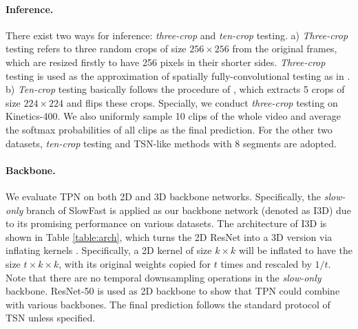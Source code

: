 \documentclass[10pt,twocolumn,letterpaper]{article}
\begin{document}
\paragraph{Inference.}
There exist two ways for inference: \emph{three-crop} and \emph{ten-crop} testing.
a) \emph{Three-crop} testing refers to three random crops of size $256\times256$ from the original frames, which are resized firstly to have 256 pixels in their shorter sides.
\emph{Three-crop} testing is used as the approximation of spatially fully-convolutional testing as in \cite{vggnet, nonlocal, slowfast}. 
b) \emph{Ten-crop} testing basically follows the procedure of \cite{tsn}, which extracts 5 crops of size $224\times224$ and flips these crops.
Specially, we conduct \emph{three-crop} testing on Kinetics-400. We also uniformly sample 10 clips of the whole video and average the softmax probabilities of all clips as the final prediction.
For the other two datasets, \emph{ten-crop} testing and TSN-like methods with 8 segments are adopted. 

\paragraph{Backbone.}
We evaluate TPN on both 2D and 3D backbone networks.
Specifically, the \emph{slow-only} branch of SlowFast \cite{slowfast} is applied as our backbone network (denoted as I3D) due to its promising performance on various datasets. 
The architecture of I3D is shown in Table \ref{table:arch}, which turns the 2D ResNet \cite{resnet} into a 3D version via inflating kernels \cite{nonlocal, kinetics}.
Specifically, a 2D kernel of size $k \times k$ will be inflated to have the size $t \times k \times k$, with its original weights copied for $t$ times and rescaled by $1/t$.
Note that there are no temporal downsampling operations in the \emph{slow-only} backbone.
ResNet-50 \cite{resnet} is used as 2D backbone to show that TPN could combine with various backbones.
The final prediction follows the standard protocol of TSN \cite{tsn} unless specified.
\end{document}
